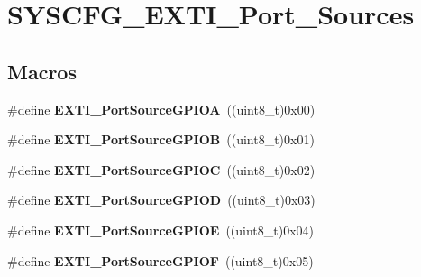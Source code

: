 \hypertarget{group___s_y_s_c_f_g___e_x_t_i___port___sources}{}\section{S\+Y\+S\+C\+F\+G\+\_\+\+E\+X\+T\+I\+\_\+\+Port\+\_\+\+Sources}
\label{group___s_y_s_c_f_g___e_x_t_i___port___sources}
\subsection*{Macros}
\begin{DoxyCompactItemize}
\item 
\hypertarget{group___s_y_s_c_f_g___e_x_t_i___port___sources_ga66aab57f683213ff74751390162c425d}{}\#define {\bfseries E\+X\+T\+I\+\_\+\+Port\+Source\+G\+P\+I\+O\+A}~((uint8\+\_\+t)0x00)\label{group___s_y_s_c_f_g___e_x_t_i___port___sources_ga66aab57f683213ff74751390162c425d}

\item 
\hypertarget{group___s_y_s_c_f_g___e_x_t_i___port___sources_ga16ab9db3a6cfad6e0204daeea375fadf}{}\#define {\bfseries E\+X\+T\+I\+\_\+\+Port\+Source\+G\+P\+I\+O\+B}~((uint8\+\_\+t)0x01)\label{group___s_y_s_c_f_g___e_x_t_i___port___sources_ga16ab9db3a6cfad6e0204daeea375fadf}

\item 
\hypertarget{group___s_y_s_c_f_g___e_x_t_i___port___sources_ga827bef5afe2be4ac3db7f8f1fc538d6e}{}\#define {\bfseries E\+X\+T\+I\+\_\+\+Port\+Source\+G\+P\+I\+O\+C}~((uint8\+\_\+t)0x02)\label{group___s_y_s_c_f_g___e_x_t_i___port___sources_ga827bef5afe2be4ac3db7f8f1fc538d6e}

\item 
\hypertarget{group___s_y_s_c_f_g___e_x_t_i___port___sources_gaa46454cf1df3cc5c1dfceb460e5345d8}{}\#define {\bfseries E\+X\+T\+I\+\_\+\+Port\+Source\+G\+P\+I\+O\+D}~((uint8\+\_\+t)0x03)\label{group___s_y_s_c_f_g___e_x_t_i___port___sources_gaa46454cf1df3cc5c1dfceb460e5345d8}

\item 
\hypertarget{group___s_y_s_c_f_g___e_x_t_i___port___sources_gab9d4c8777a3f5c9cc90ae844b1c2bbfa}{}\#define {\bfseries E\+X\+T\+I\+\_\+\+Port\+Source\+G\+P\+I\+O\+E}~((uint8\+\_\+t)0x04)\label{group___s_y_s_c_f_g___e_x_t_i___port___sources_gab9d4c8777a3f5c9cc90ae844b1c2bbfa}

\item 
\hypertarget{group___s_y_s_c_f_g___e_x_t_i___port___sources_ga942c607129ec8fa9397417236be932d1}{}\#define {\bfseries E\+X\+T\+I\+\_\+\+Port\+Source\+G\+P\+I\+O\+F}~((uint8\+\_\+t)0x05)\label{group___s_y_s_c_f_g___e_x_t_i___port___sources_ga942c607129ec8fa9397417236be932d1}


\end{DoxyCompactItemize}
